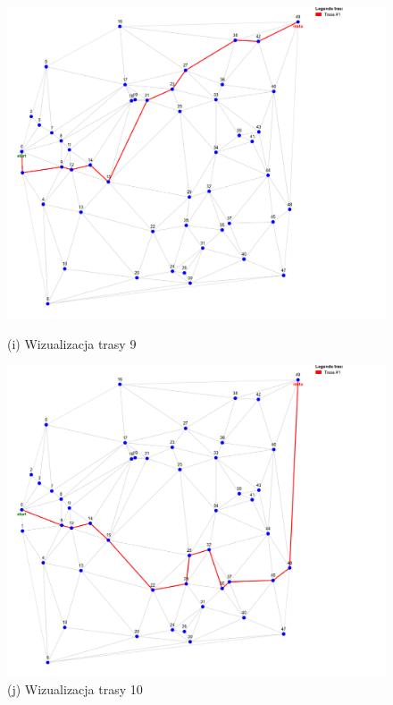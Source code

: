 \documentclass{article}
\begin{document}
\begin{figure}[H]
    \begin{minipage}[b]{0.48\linewidth}
        \includegraphics[width=\linewidth]{9.png}
        \caption*{(i) Wizualizacja trasy 9}
    \end{minipage}
    \hfill
    \begin{minipage}[b]{0.48\linewidth}
        \includegraphics[width=\linewidth]{10.png}
        \caption*{(j) Wizualizacja trasy 10}
    \end{minipage}
    \vspace{0.5em}


\end{figure}
\end{document}
